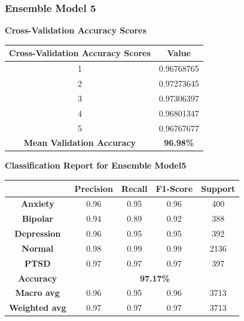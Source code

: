 \subsubsection{Ensemble Model 5}

\begin{center}
    \textbf{Cross-Validation Accuracy Scores} \\[0.5em]
    \begin{tabular}{|c|c|}
        \hline
        \textbf{Cross-Validation Accuracy Scores} & \textbf{Value} \\ \hline
        1 & 0.96768765 \\ \hline
        2 & 0.97273645 \\ \hline
        3 & 0.97306397 \\ \hline
        4 & 0.96801347 \\ \hline
        5 & 0.96767677 \\ \hline
        \textbf{Mean Validation Accuracy} & \textbf{96.98\%} \\ \hline
    \end{tabular}
\end{center}

\begin{center}
    \textbf{Classification Report for Ensemble Model5} \\[0.5em]
    \begin{tabular}{|c|c|c|c|c|}
        \hline
        & \textbf{Precision} & \textbf{Recall} & \textbf{F1-Score} & \textbf{Support} \\ \hline
        \textbf{Anxiety}    & 0.96 & 0.95 & 0.96 & 400 \\ \hline
        \textbf{Bipolar}    & 0.94 & 0.89 & 0.92 & 388 \\ \hline
        \textbf{Depression} & 0.96 & 0.95 & 0.95 & 392 \\ \hline
        \textbf{Normal}     & 0.98 & 0.99 & 0.99 & 2136 \\ \hline
        \textbf{PTSD}       & 0.97 & 0.97 & 0.97 & 397 \\ \hline
        \textbf{Accuracy}   & \multicolumn{4}{c|}{\textbf{97.17\%}} \\ \hline
        \textbf{Macro avg}  & 0.96 & 0.95 & 0.96 & 3713 \\ \hline
        \textbf{Weighted avg} & 0.97 & 0.97 & 0.97 & 3713 \\ \hline
    \end{tabular}
\end{center}


